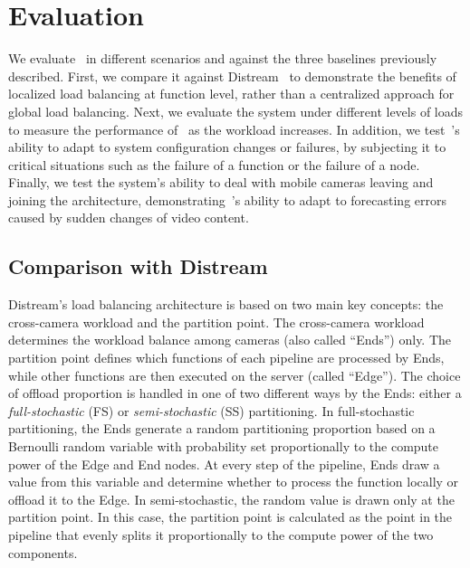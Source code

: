 \section{Evaluation}\label{sec:evaluation}

We evaluate~\videojam{} in different scenarios and against the three baselines previously described. First, we compare it against Distream~\cite{zeng2020distream} to demonstrate the benefits of localized load balancing at function level, rather than a centralized approach for global load balancing. Next, we evaluate the system under different levels of loads to measure the performance of~\videojam{} as the workload increases. In addition, we test~\videojam{}'s ability to adapt to system configuration changes or failures, by subjecting it to critical situations such as the failure of a function or the failure of a node. Finally, we test the system's ability to deal with mobile cameras leaving and joining the architecture, demonstrating~\videojam{}'s ability to adapt to forecasting errors caused by sudden changes of video content.

\subsection{Comparison with Distream}
Distream's load balancing architecture is based on two main key concepts: the cross-camera workload and the partition point. The cross-camera workload determines the workload balance among cameras (also called ``Ends'') only. The partition point defines which functions of each pipeline are processed by Ends, while other functions are then executed on the server (called ``Edge''). The choice of offload proportion is handled in one of two different ways by the Ends: either a \textit{full-stochastic} (FS) or \textit{semi-stochastic} (SS) partitioning. In full-stochastic partitioning, the Ends generate a random partitioning proportion based on a Bernoulli random variable with probability set proportionally to the compute power of the Edge and End nodes. At every step of the pipeline, Ends draw a value from this variable and determine whether to process the function locally or offload it to the Edge. In semi-stochastic, the random value is drawn only at the partition point. In this case, the partition point is calculated as the point in the pipeline that evenly splits it proportionally to the compute power of the two components. 

